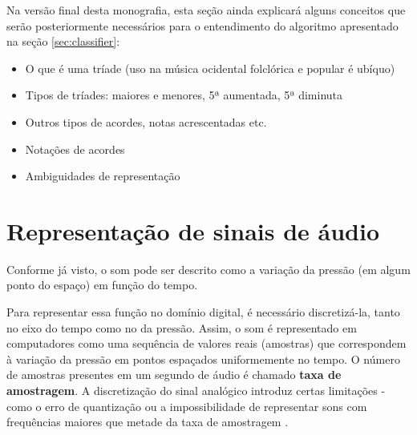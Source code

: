     Na versão final desta monografia, esta seção ainda explicará alguns conceitos que serão posteriormente necessários para o entendimento do algoritmo apresentado na seção \ref{sec:classifier}:

    \begin{itemize}
        \item O que é uma tríade (uso na música ocidental folclórica e popular é ubíquo)
        \item Tipos de tríades: maiores e menores, 5ª aumentada, 5ª diminuta
        \item Outros tipos de acordes, notas acrescentadas etc.
        \item Notações de acordes
        \item Ambiguidades de representação
    \end{itemize}



\section{Representação de sinais de áudio}
    
    Conforme já visto, o som pode ser descrito como a variação da pressão (em algum ponto do espaço) em função do tempo.
    
    Para representar essa função no domínio digital, é necessário discretizá-la, tanto no eixo do tempo como no da pressão. Assim, o som é representado em computadores como uma sequência de valores reais (amostras) que correspondem à variação da pressão em pontos espaçados uniformemente no tempo. O número de amostras presentes em um segundo de áudio é chamado \textbf{taxa de amostragem}. A discretização do sinal analógico introduz certas limitações - como o erro de quantização ou a impossibilidade de representar sons com frequências maiores que metade da taxa de amostragem \citep[ver][seções 1.3.2 e 1.6]{dsp}.
    
